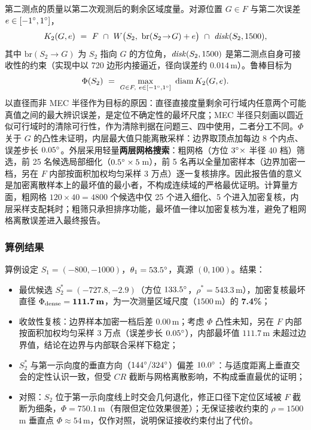 \documentclass[12pt,a4paper]{ctexart}
\begin{document}
第二测点的质量以第二次观测后的剩余区域度量。对源位置 $G\in F$ 与第二次误差 $e\in[-1^{\circ},1^{\circ}]$，
\begin{equation}
  K_2(G,e)\ =\ F\ \cap\ W\bigl(S_2,\ \mathrm{br}(S_2\!\to\! G)+e\bigr)\ \cap\ \disk(S_2,1500),
\end{equation}
其中 $\mathrm{br}(S_2\!\to\! G)$ 为 $S_2$ 指向 $G$ 的方位角，$\mathit{disk}(S_2,1500)$ 是第二测点自身可接收性的约束（实现中以 720 边形内接逼近，径向误差约 $0.014\,$m）。鲁棒目标为
\begin{equation}
  \Phi(S_2)\ =\ \max_{G\in F,\ e\in[-1\degr,1\degr]}\ \diam K_2(G,e).
\end{equation}
以直径而非 MEC 半径作为目标的原因：直径直接度量剩余可行域内任意两个可能真值之间的最大辨识误差，是定位不确定性的最坏尺度；MEC 半径只刻画以圆近似可行域时的清除可行性，作为清除判据在问题三、四中使用，二者分工不同。$\Phi$ 关于 $G$ 的凸性未证明，内层最大值只能离散采样：边界取顶点加每边 8 个内点、误差步长 $0.05^{\circ}$。外层采用轻量\textbf{两层网格搜索}：粗网格（方位 $3^{\circ}\times$ 半径 40 档）筛选，前 25 名候选局部细化（$0.5^{\circ}\times 5\,$m），前 5 名再以全量加密样本（边界加密一档，另在 $F$ 内部按面积加权均匀采样 3 万点）逐一复核排序。因此报告值的意义是加密离散样本上的最坏值的最小者，不构成连续域的严格最优证明。计算量方面，粗网格 $120\times 40=4800$ 个候选中仅 25 个进入细化、5 个进入加密复核，内层采样支配耗时；粗筛只承担排序功能，最坏值一律以加密复核为准，避免了粗网格离散误差进入最终报告。

\subsubsection{算例结果}

算例设定 $S_1=(-800,-1000)$，$\theta_1=53.5^{\circ}$，真源 $(0,100)$。结果：

\begin{itemize}[leftmargin=2em,itemsep=3pt]
  \item 最优候选 $S_2^{*}=(-727.8,-2.9)$（方位 $133.5^{\circ}$，$\rho^{*}=543.3\,$m），加密复核最坏直径 $\Phi_{\mathrm{dense}}=\textbf{111.7\,m}$，为一次测量区域尺度（$1500\,$m）的 \textbf{7.4\%}；
  \item 收敛性复核：边界样本加密一档后差 $0.00\,$m；考虑 $\Phi$ 凸性未知，另在 $F$ 内部按面积加权均匀采样 3 万点（误差步长 $0.05^{\circ}$），内部最坏值 $111.7\,$m 未超过边界值，结论在边界与内部联合采样下稳定；
  \item $S_2^{*}$ 与第一示向度的垂直方向（$144^{\circ}/324^{\circ}$）偏差 $10.0^{\circ}$：与适度距离上垂直交会的定性认识一致，但受 $CR$ 截断与网格离散影响，不构成垂直最优的证明；
  \item 对照：$S_2$ 位于第一示向度线上时交会几何退化，修正口径下定位区域被 $F$ 截断为细条，$\Phi=750.1\,$m（有限但定位效果很差）；无保证接收约束的 $\rho=1500\,$m 垂直点 $\Phi\approx 54\,$m，仅作对照，说明保证接收约束付出了代价。
\end{itemize}
\end{document}
